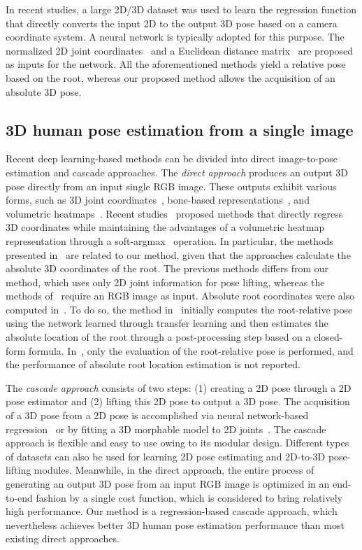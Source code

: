 \documentclass[10pt,twocolumn,letterpaper]{article}
\begin{document}
In recent studies, a large 2D/3D dataset was used to learn the regression function that directly converts the input 2D to the output 3D pose based on a camera coordinate system. A neural network is typically adopted for this purpose. The normalized 2D joint coordinates~\cite{Martinez2017} and a Euclidean distance matrix~\cite{Moreno-Noguer2017} are proposed as inputs for the network. All the aforementioned methods yield a relative pose based on the root, whereas our proposed method allows the acquisition of an absolute 3D pose.

\subsection{3D human pose estimation from a single image}

Recent deep learning-based methods can be divided into direct image-to-pose estimation and cascade approaches. The \textit{direct approach} produces an output 3D pose directly from an input single RGB image. These outputs exhibit various forms, such as 3D joint coordinates~\cite{Li2014}, bone-based representations~\cite{Sun2017}, and volumetric heatmaps~\cite{Pavlakos2017}. Recent studies~\cite{Moon2019b,Sarandi2018,Sun2018} proposed methods that directly regress 3D coordinates while maintaining the advantages of a volumetric heatmap representation through a soft-argmax~\cite{Luvizon2017,Nibali2018} operation. In particular, the methods presented in~\cite{Moon2019b,Sarandi2018} are related to our method, given that the approaches calculate the absolute 3D coordinates of the root. The previous methods differs from our method, which uses only 2D joint information for pose lifting, whereas the methods of~\cite{Moon2019b,Sarandi2018} require an RGB image as input. Absolute root coordinates were also computed in~\cite{Mehta2017}. To do so, the method in~\cite{Mehta2017} initially computes the root-relative pose using the network learned through transfer learning and then estimates the absolute location of the root through a post-processing step based on a closed-form formula. In~\cite{Mehta2017,Sarandi2018}, only the evaluation of the root-relative pose is performed, and the performance of absolute root location estimation is not reported.

The \textit{cascade approach} consists of two steps: (1) creating a 2D pose through a 2D pose estimator and (2) lifting this 2D pose to output a 3D pose. The acquisition of a 3D pose from a 2D pose is accomplished via neural network-based regression~\cite{Fang2018,Martinez2017,Moreno-Noguer2017} or by fitting a 3D morphable model to 2D joints~\cite{Bogo2016}. The cascade approach is flexible and easy to use owing to its modular design. Different types of datasets can also be used for learning 2D pose estimating and 2D-to-3D pose-lifting modules. Meanwhile, in the direct approach, the entire process of generating an output 3D pose from an input RGB image is optimized in an end-to-end fashion by a single cost function, which is considered to bring relatively high performance. Our method is a regression-based cascade approach, which nevertheless achieves better 3D human pose estimation performance than most existing direct approaches.
\end{document}
